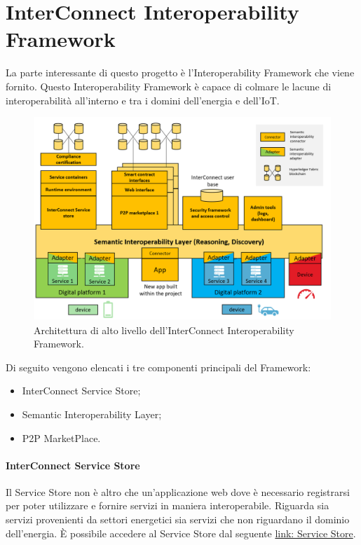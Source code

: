 \section{InterConnect Interoperability Framework}
La parte interessante di questo progetto è l'Interoperability Framework che viene fornito.
Questo Interoperability Framework è capace di colmare le lacune di interoperabilità all'interno e tra i domini dell'energia e dell'IoT.

\begin{figure}[H]
    \centering
    \includegraphics[width=\textwidth]{figures/architetturaFrameworkInterconnect.png}
    \caption{Architettura di alto livello dell'InterConnect Interoperability Framework.}
    \label{fig:architetturaFrameworkInterconnect}
\end{figure}

Di seguito vengono elencati i tre componenti principali del Framework:
\begin{itemize}
    \item InterConnect Service Store;
    \item Semantic Interoperability Layer;
    \item P2P MarketPlace.
\end{itemize}

\paragraph{InterConnect Service Store}

Il Service Store non è altro che un'applicazione web dove è necessario registrarsi per poter utilizzare e fornire servizi in maniera interoperabile. Riguarda sia servizi provenienti da settori energetici sia servizi che non riguardano il dominio dell'energia.
È possibile accedere al Service Store dal seguente \href{https://store.interconnectproject.eu/ServiceStore}{link: Service Store}.

